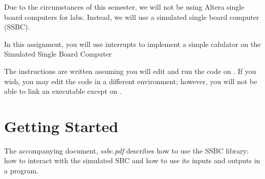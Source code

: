 


\usepackage{enumitem}
\usepackage{graphicx}
\usepackage{media9}
\usepackage{addfont}

\renewcommand{\labnumber}{\ssbcinterruptnumber}
\renewcommand{\labname}{Using Interrupts to Detect Inputs on Simulated Hardware}
\renewcommand{\shortlabname}{ssbclab-interrupts}
\renewcommand{\collaborationrules}{\ssbcinterruptcollaboration}
\renewcommand{\duedate}{\ssbcinterruptdue}
\pagelayout

\labidentifier


Due to the circumstances of this semester, we will not be using Altera
single board computers for labs. Instead, we will use a simulated single
board computer (SSBC).

In this assignment, you will use interrupts to implement a simple calulator on the
Simulated Single Board Computer

The instructions are written assuming you will edit and run the code on
\runtimeenvironment. If you wish, you may edit the code in a different
environment; however, you will not be able to link an executable except on
\runtimeenvironment.

\section{Getting Started}

The accompanying document, \textit{ssbc.pdf} describes how to use the SSBC
library: how to interact with the simulated SBC and how to use its inputs and
outputs in a program.

